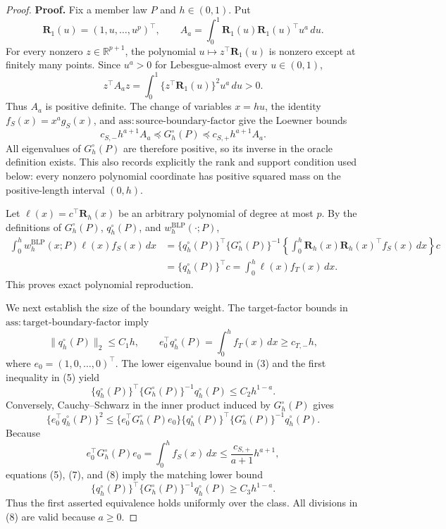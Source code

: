 \documentclass{article}
\begin{document}
\begin{proof}
\textbf{Proof.}
Fix a member law \(P\) and \(h\in(0,1)\). Put
\[
\mathbf R_1(u)=(1,u,\ldots,u^p)^\top,
\qquad
A_a=\int_0^1\mathbf R_1(u)\mathbf R_1(u)^\top u^a\,du.
\tag{1}
\]
For every nonzero \(z\in\mathbb R^{p+1}\), the polynomial
\(u\mapsto z^\top\mathbf R_1(u)\) is nonzero except at finitely many points. Since
\(u^a>0\) for Lebesgue-almost every \(u\in(0,1)\),
\[
z^\top A_a z=\int_0^1\{z^\top\mathbf R_1(u)\}^2u^a\,du>0.
\tag{2}
\]
Thus \(A_a\) is positive definite. The change of variables \(x=hu\), the identity
\(f_S(x)=x^ag_S(x)\), and \(\mathrm{ass:source\text{-}boundary\text{-}factor}\) give the Loewner bounds
\[
c_{S,-}h^{a+1}A_a
\preceq G_h^{\circ}(P)
\preceq c_{S,+}h^{a+1}A_a.
\tag{3}
\]
All eigenvalues of \(G_h^{\circ}(P)\) are therefore positive, so its inverse in the oracle definition exists. This also records explicitly the rank and support condition used below: every nonzero polynomial coordinate has positive squared mass on the positive-length interval \((0,h)\).

Let \(\ell(x)=c^\top\mathbf R_h(x)\) be an arbitrary polynomial of degree at most \(p\). By the definitions of \(G_h^{\circ}(P)\), \(q_h^{\circ}(P)\), and \(w_h^{\mathrm{BLP}}(\cdot;P)\),
\[
\begin{aligned}
\int_0^h w_h^{\mathrm{BLP}}(x;P)\ell(x)f_S(x)\,dx
&=\{q_h^{\circ}(P)\}^\top\{G_h^{\circ}(P)\}^{-1}
  \left\{\int_0^h\mathbf R_h(x)\mathbf R_h(x)^\top f_S(x)\,dx\right\}c\\
&=\{q_h^{\circ}(P)\}^\top c
=\int_0^h\ell(x)f_T(x)\,dx.
\end{aligned}
\tag{4}
\]
This proves exact polynomial reproduction.

We next establish the size of the boundary weight. The target-factor bounds in \(\mathrm{ass:target\text{-}boundary\text{-}factor}\) imply
\[
\|q_h^{\circ}(P)\|_2\le C_1h,
\qquad
e_0^\top q_h^{\circ}(P)=\int_0^hf_T(x)\,dx\ge c_{T,-}h,
\tag{5}
\]
where \(e_0=(1,0,\ldots,0)^\top\). The lower eigenvalue bound in (3) and the first inequality in (5) yield
\[
\{q_h^{\circ}(P)\}^\top\{G_h^{\circ}(P)\}^{-1}q_h^{\circ}(P)\le C_2h^{1-a}.
\tag{6}
\]
Conversely, Cauchy--Schwarz in the inner product induced by \(G_h^{\circ}(P)\) gives
\[
\{e_0^\top q_h^{\circ}(P)\}^2
\le\{e_0^\top G_h^{\circ}(P)e_0\}
\{q_h^{\circ}(P)\}^\top\{G_h^{\circ}(P)\}^{-1}q_h^{\circ}(P).
\tag{7}
\]
Because
\[
e_0^\top G_h^{\circ}(P)e_0=\int_0^hf_S(x)\,dx
\le \frac{c_{S,+}}{a+1}h^{a+1},
\tag{8}
\]
equations (5), (7), and (8) imply the matching lower bound
\[
\{q_h^{\circ}(P)\}^\top\{G_h^{\circ}(P)\}^{-1}q_h^{\circ}(P)\ge C_3h^{1-a}.
\tag{9}
\]
Thus the first asserted equivalence holds uniformly over the class. All divisions in (8) are valid because \(a\ge0\).


\end{proof}
\end{document}
